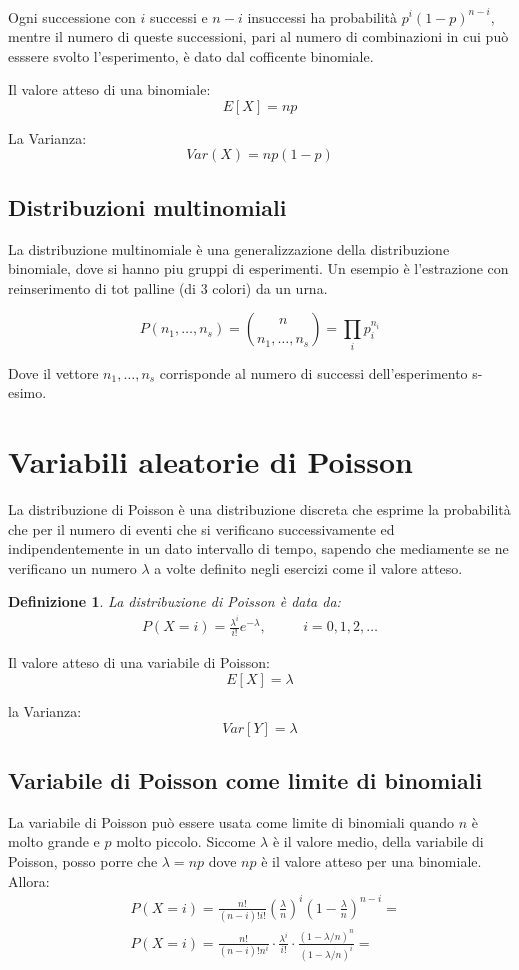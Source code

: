 \documentclass[12pt]{article}
\newtheorem{definition}{Definizione}[section]
\begin{document}
Ogni successione con \(i\) successi e \(n-i\) insuccessi ha probabilità \(p^i(1-p)^{n-i}\), mentre il numero
di queste successioni, pari al numero di combinazioni in cui può esssere svolto l'esperimento, 
è dato dal cofficente binomiale.

\newpage
Il valore atteso di una binomiale:
\[
E[X] = np    
\]

La Varianza:
\[
Var(X) = np(1-p)    
\]

\subsection{Distribuzioni multinomiali}

La distribuzione multinomiale è una generalizzazione della distribuzione binomiale, dove si hanno piu gruppi di esperimenti.
Un esempio è l'estrazione con reinserimento di tot palline (di 3 colori) da un urna. 

\[
P(n_1,\dots,n_s) = \binom{n}{n_1,\dots,n_s} = \prod_i p_i^{n_i}   
\]

Dove il vettore \(n_1,\dots,n_s\) corrisponde al numero di successi dell'esperimento s-esimo. 

\newpage
\section{Variabili aleatorie di Poisson}
La distribuzione di Poisson è una distribuzione discreta che esprime la probabilità
che per il numero di eventi che si verificano successivamente ed indipendentemente in un 
dato intervallo di tempo, sapendo che mediamente se ne verificano un numero \(\lambda\) a volte 
definito negli esercizi come il valore atteso.

\begin{definition}
    La distribuzione di Poisson è data da:
    \begin{align*}
        P(X=i) = \frac{\lambda^i}{i!}e^{-\lambda}, && \quad i=0,1,2,\dots
    \end{align*}
\end{definition}

Il valore atteso di una variabile di Poisson:
\[
E[X] =\lambda    
\]

la Varianza:
\[
Var[Y] = \lambda    
\]

\subsection{Variabile di Poisson come limite di binomiali}
La variabile di Poisson può essere usata come limite di binomiali quando \(n\)
è molto grande e \(p\) molto piccolo. Siccome \(\lambda\) è il valore medio, della variabile di Poisson, 
posso porre che \(\lambda = np\) dove \(np\) è il valore atteso per una binomiale. Allora:
\begin{align*}
    &P(X=i) = \frac{n!}{(n-i)!i!} \left( \frac{\lambda}{n} \right)^i \left( 1-\frac{\lambda}{n} \right)^{n-i} =\\
    &P(X=i) = \frac{n!}{(n-i)!n^i}\cdot  \frac{\lambda^i}{i!} \cdot \frac{(1-\lambda/n)^n}{(1-\lambda/n)^i} = 
\end{align*}
\end{document}

